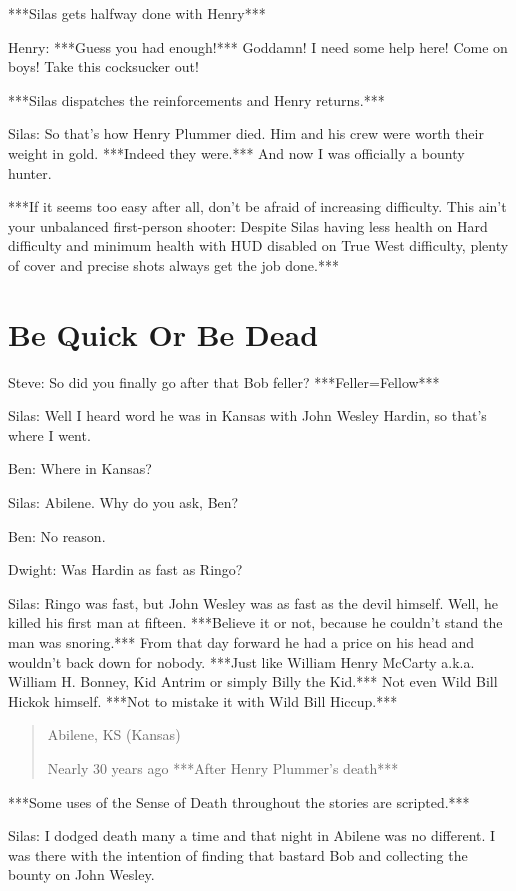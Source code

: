 \documentclass{article}
\begin{document}
***Silas gets halfway done with Henry***

Henry: ***Guess you had enough!*** Goddamn! I need some help here! Come on boys! Take this cocksucker out!

***Silas dispatches the reinforcements and Henry returns.***

Silas: So that's how Henry Plummer died. Him and his crew were worth their weight in gold. ***Indeed they were.*** And now I was officially a bounty hunter.

***If it seems too easy after all, don't be afraid of increasing difficulty. This ain't your unbalanced first-person shooter: Despite Silas having less health on Hard difficulty and minimum health with HUD disabled on True West difficulty, plenty of cover and precise shots always get the job done.***

\section*{Be Quick Or Be Dead}

Steve: So did you finally go after that Bob feller? ***Feller=Fellow***

Silas: Well I heard word he was in Kansas with John Wesley Hardin, so that's where I went.

Ben: Where in Kansas?

Silas: Abilene. Why do you ask, Ben?

Ben: No reason.

Dwight: Was Hardin as fast as Ringo?

Silas: Ringo was fast, but John Wesley was as fast as the devil himself. Well, he killed his first man at fifteen. ***Believe it or not, because he couldn't stand the man was snoring.*** From that day forward he had a price on his head and wouldn't back down for nobody. ***Just like William Henry McCarty a.k.a. William H. Bonney, Kid Antrim or simply Billy the Kid.*** Not even Wild Bill Hickok himself. ***Not to mistake it with Wild Bill Hiccup.***
 \begin{quote}
    Abilene, KS (Kansas)
    
    Nearly 30 years ago ***After Henry Plummer's death***
 \end{quote}

***Some uses of the Sense of Death throughout the stories are scripted.***

Silas: I dodged death many a time and that night in Abilene was no different. I was there with the intention of finding that bastard Bob and collecting the bounty on John Wesley.
\end{document}
